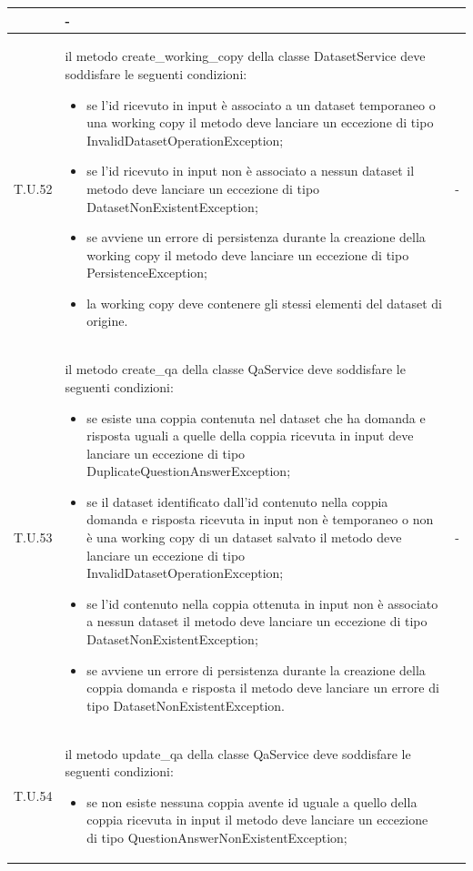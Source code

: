 \begin{tabularx}{\textwidth}{|c|X|c|}
\begin{itemize}
    \end{itemize} & - \\
    \hline 
    \label{tu:tu52} T.U.52 & il metodo create\_working\_copy della classe DatasetService deve soddisfare le seguenti condizioni:
    \begin{itemize}
        \item se l'id ricevuto in input è associato a un dataset temporaneo o una working copy il metodo deve lanciare un eccezione di tipo InvalidDatasetOperationException;
        \item se l'id ricevuto in input non è associato a nessun dataset il metodo deve lanciare un eccezione di tipo DatasetNonExistentException;
        \item se avviene un errore di persistenza durante la creazione della working copy il metodo deve lanciare un eccezione di tipo PersistenceException;
        \item la working copy deve contenere gli stessi elementi del dataset di origine. 
    \end{itemize} & - \\
    \hline 
    \label{tu:tu53} T.U.53 & il metodo create\_qa della classe QaService deve soddisfare le seguenti condizioni:
    \begin{itemize}
        \item se esiste una coppia contenuta nel dataset che ha domanda e risposta uguali a quelle della coppia ricevuta in input deve lanciare un eccezione di tipo DuplicateQuestionAnswerException;
        \item se il dataset identificato dall'id contenuto nella coppia domanda e risposta ricevuta in input non è temporaneo o non è una working copy di un dataset salvato il metodo deve lanciare un eccezione di tipo InvalidDatasetOperationException;
        \item se l'id contenuto nella coppia ottenuta in input non è associato a nessun dataset il metodo deve lanciare un eccezione di tipo DatasetNonExistentException;
        \item se avviene un errore di persistenza durante la creazione della coppia domanda e risposta il metodo deve lanciare un errore di tipo DatasetNonExistentException.
    \end{itemize} & - \\
    \hline 
    \label{tu:tu54} T.U.54 & il metodo update\_qa della classe QaService deve soddisfare le seguenti condizioni:
    \begin{itemize}
        \item se non esiste nessuna coppia avente id uguale a quello della coppia ricevuta in input il metodo deve lanciare un eccezione di tipo QuestionAnswerNonExistentException;

\end{itemize}
\end{tabularx}
